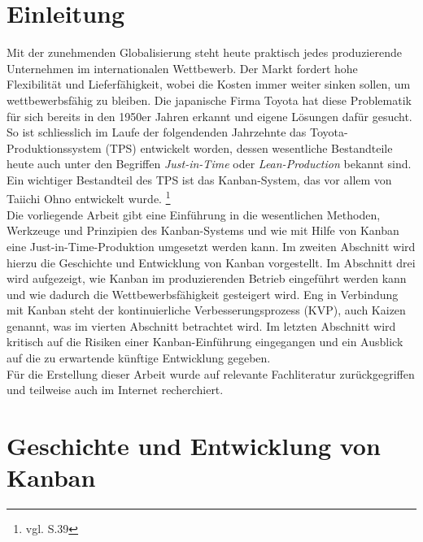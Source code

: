 \section{Einleitung}
Mit der zunehmenden Globalisierung steht heute praktisch jedes produzierende Unternehmen 
im internationalen Wettbewerb. Der Markt fordert hohe Flexibilität und Lieferfähigkeit, 
wobei die Kosten immer weiter sinken sollen, um wettbewerbsfähig zu bleiben.
Die japanische Firma Toyota hat diese Problematik für sich bereits in den 1950er
Jahren erkannt und eigene Lösungen dafür gesucht. So ist schliesslich im Laufe der
folgendenden Jahrzehnte das Toyota-Produktionssystem (TPS) entwickelt worden, dessen 
wesentliche Bestandteile heute auch unter den Begriffen  \emph{Just-in-Time} oder  
 \emph{Lean-Production} bekannt sind. Ein wichtiger Bestandteil des TPS ist das
Kanban-System, das vor allem von Taiichi Ohno entwickelt wurde.
\footnote{vgl. \cite{Ohno2013TPS} S.39}\\
Die vorliegende Arbeit gibt eine Einführung in die wesentlichen Methoden, 
Werkzeuge und Prinzipien des Kanban-Systems und wie mit Hilfe von Kanban eine
Just-in-Time-Produktion umgesetzt werden kann. Im zweiten Abschnitt wird hierzu
die Geschichte und Entwicklung von Kanban vorgestellt.
Im Abschnitt drei wird aufgezeigt, wie Kanban im produzierenden Betrieb 
eingeführt werden kann und wie dadurch die Wettbewerbsfähigkeit gesteigert wird. 
Eng in Verbindung mit Kanban steht der kontinuierliche Verbesserungsprozess 
(KVP), auch Kaizen genannt, was im vierten Abschnitt betrachtet wird.
Im letzten Abschnitt wird kritisch auf die Risiken einer Kanban-Einführung
eingegangen und ein Ausblick auf die zu erwartende künftige Entwicklung gegeben.\\
Für die Erstellung dieser Arbeit wurde auf relevante Fachliteratur zurückgegriffen
und teilweise auch im Internet recherchiert.


\section{Geschichte und Entwicklung von Kanban}

